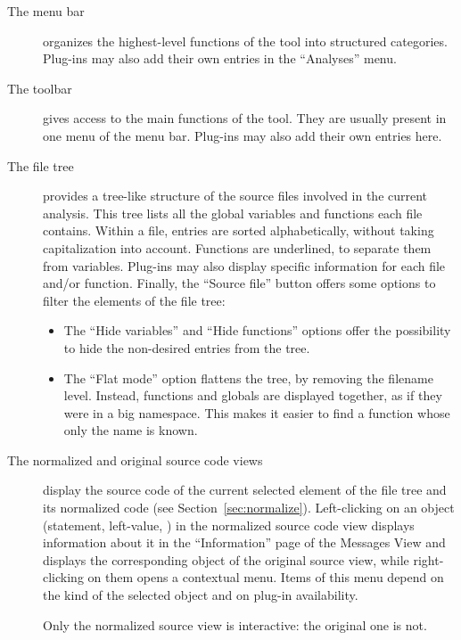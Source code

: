 \begin{description}
\item [The menu bar] organizes the highest-level functions of the tool into
  structured categories. Plug-ins may also add their own entries in the
  ``Analyses'' menu.

\item [The toolbar] gives access to the main functions of the tool. They
  are usually present in one menu of the menu bar. Plug-ins may also add their
  own entries here.

\item [The file tree] provides a tree-like structure of the source
  files involved in the current analysis. This tree lists all the global
  variables and functions each file contains. Within a file, entries
  are sorted alphabetically, without taking capitalization into
  account. Functions are underlined, to separate them from variables.
  Plug-ins may also display specific information for each file and/or
  function. Finally, the ``Source file'' button offers some options to
  filter the elements of the file tree:
  \begin{itemize}
  \item The ``Hide variables'' and ``Hide functions'' options offer
    the possibility to hide the non-desired entries from the tree.

  \item The ``Flat mode'' option flattens the tree, by removing the
    filename level. Instead, functions and globals are displayed together,
    as if they were in a big namespace. This makes it easier
    to find a function whose only the name is known.

  \end{itemize}

\item [The normalized and original source code views] display the source code
  of the current selected element of the file tree and its normalized code (see
  Section~\ref{sec:normalize}). Left-clicking on an object (statement,
  left-value, \etc) in the normalized source code view displays information
  about it in the ``Information'' page of the Messages View and displays the
  corresponding object of the original source view, while right-clicking on
  them opens a contextual menu. Items of this menu depend on the kind of the
  selected object and on plug-in availability.

  \begin{important}
    Only the normalized source view is interactive: the original one is not.
  \end{important}


\end{description}
